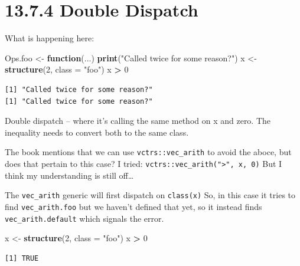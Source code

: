 \documentclass[]{book}
\newenvironment{Shaded}{\begin{snugshade}}{\end{snugshade}}
\newcommand{\ControlFlowTok}[1]{\textcolor[rgb]{0.13,0.29,0.53}{\textbf{#1}}}
\newcommand{\DataTypeTok}[1]{\textcolor[rgb]{0.13,0.29,0.53}{#1}}
\newcommand{\DecValTok}[1]{\textcolor[rgb]{0.00,0.00,0.81}{#1}}
\newcommand{\KeywordTok}[1]{\textcolor[rgb]{0.13,0.29,0.53}{\textbf{#1}}}
\newcommand{\NormalTok}[1]{#1}
\newcommand{\OperatorTok}[1]{\textcolor[rgb]{0.81,0.36,0.00}{\textbf{#1}}}
\newcommand{\StringTok}[1]{\textcolor[rgb]{0.31,0.60,0.02}{#1}}
\begin{document}
\hypertarget{double-dispatch}{%
\section*{13.7.4 Double Dispatch}\label{double-dispatch}}

What is happening here:

\begin{Shaded}
\begin{Highlighting}[]
\NormalTok{Ops.foo <-}\StringTok{ }\ControlFlowTok{function}\NormalTok{(...)  }\KeywordTok{print}\NormalTok{(}\StringTok{"Called twice for some reason?"}\NormalTok{)}
\NormalTok{x <-}\StringTok{ }\KeywordTok{structure}\NormalTok{(}\DecValTok{2}\NormalTok{, }\DataTypeTok{class =} \StringTok{"foo"}\NormalTok{)}
\NormalTok{x }\OperatorTok{>}\StringTok{ }\DecValTok{0}
\end{Highlighting}
\end{Shaded}

\begin{verbatim}
[1] "Called twice for some reason?"
[1] "Called twice for some reason?"
\end{verbatim}

Double dispatch -- where it's calling the same method on x and zero. The inequality needs to convert both to the same class.

The book mentions that we can use \texttt{vctrs::vec\_arith} to avoid the aboce, but does that pertain to this case? I tried: \texttt{vctrs::vec\_arith("\textgreater{}",\ x,\ 0)} But I think my understanding is still off\ldots{}

The \texttt{vec\_arith} generic will first dispatch on \texttt{class(x)} So, in this case it tries to find \texttt{vec\_arith.foo} but we haven't defined that yet, so it instead finds \texttt{vec\_arith.default} which signals the error.

\begin{Shaded}
\begin{Highlighting}[]
\NormalTok{x <-}\StringTok{ }\KeywordTok{structure}\NormalTok{(}\DecValTok{2}\NormalTok{, }\DataTypeTok{class =} \StringTok{"foo"}\NormalTok{)}
\NormalTok{x }\OperatorTok{>}\StringTok{ }\DecValTok{0}
\end{Highlighting}
\end{Shaded}

\begin{verbatim}
[1] TRUE
\end{verbatim}
\end{document}
